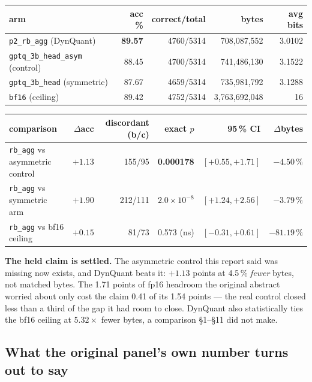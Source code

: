 \documentclass[11pt]{article}
\newcommand{\pct}{\,\%}
\newcommand{\code}[1]{\texttt{#1}}
\newcommand{\e}[2]{$#1\!\times\!10^{#2}$}
\newcommand{\best}[1]{\textbf{#1}}
\begin{document}
\begin{center}\small
\begin{tabular}{@{}lrrrr@{}}
\toprule
arm & acc \% & correct/total & bytes & avg bits \\
\midrule
\rowcolor{winbg}
\code{p2\_rb\_agg} (DynQuant) & \best{89.57} & 4760/5314 & 708{,}087{,}552 & 3.0102 \\
\code{gptq\_3b\_head\_asym} (control) & 88.45 & 4700/5314 & 741{,}486{,}130 & 3.1522 \\
\code{gptq\_3b\_head} (symmetric) & 87.67 & 4659/5314 & 735{,}981{,}792 & 3.1288 \\
\code{bf16} (ceiling) & 89.42 & 4752/5314 & 3{,}763{,}692{,}048 & 16 \\
\bottomrule
\end{tabular}
\end{center}

\begin{center}\small
\begin{tabular}{@{}lrrrrr@{}}
\toprule
comparison & $\Delta$acc & discordant (b/c) & exact $p$ & 95\pct{} CI & $\Delta$bytes \\
\midrule
\rowcolor{winbg}
\code{rb\_agg} vs asymmetric control & \best{$+1.13$} & 155/95 & \best{0.000178} & $[+0.55,+1.71]$ & \best{$-4.50\pct{}$} \\
\rowcolor{winbg}
\code{rb\_agg} vs symmetric arm & \best{$+1.90$} & 212/111 & \best{\e{2.0}{-8}} & $[+1.24,+2.56]$ & \best{$-3.79\pct{}$} \\
\code{rb\_agg} vs bf16 ceiling & $+0.15$ & 81/73 & 0.573 (ns) & $[-0.31,+0.61]$ & $-81.19\pct{}$ \\
\bottomrule
\end{tabular}
\end{center}

\textbf{The held claim is settled.} The asymmetric control this report said was missing now
exists, and DynQuant beats it: $+1.13$ points at 4.5\pct{} \emph{fewer} bytes, not matched bytes.
The 1.71 points of fp16 headroom the original abstract worried about only cost the claim 0.41 of
its 1.54 points --- the real control closed less than a third of the gap it had room to close.
DynQuant also statistically ties the bf16 ceiling at $5.32\times$ fewer bytes, a comparison
\S1--\S11 did not make.

\subsection{What the original panel's own number turns out to say}
\label{sec:addendum-bytes}
\end{document}
